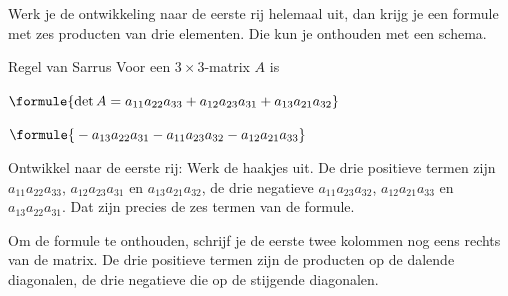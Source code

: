 
Werk je de ontwikkeling naar de eerste rij helemaal uit, dan krijg je een formule met zes producten van drie elementen. Die kun je onthouden met een schema.

\begin{theorie}
\begin{stelling}{Regel van Sarrus}
Voor een $3 \times 3$-matrix $A$ is

\vspace{1mm}
\qquad $\formule{\det A = a_{11}a_{22}a_{33} + a_{12}a_{23}a_{31} + a_{13}a_{21}a_{32}}$

\qquad\qquad\quad $\formule{{} - a_{13}a_{22}a_{31} - a_{11}a_{23}a_{32} - a_{12}a_{21}a_{33}}$
\end{stelling}

\begin{bewijs}
Ontwikkel naar de eerste rij:
Werk de haakjes uit. De drie positieve termen zijn $a_{11}a_{22}a_{33}$, $a_{12}a_{23}a_{31}$ en $a_{13}a_{21}a_{32}$, de drie negatieve $a_{11}a_{23}a_{32}$, $a_{12}a_{21}a_{33}$ en $a_{13}a_{22}a_{31}$. Dat zijn precies de zes termen van de formule.
\end{bewijs}
\end{theorie}

Om de formule te onthouden, schrijf je de eerste twee kolommen nog eens rechts van de matrix. De drie positieve termen zijn de producten op de dalende diagonalen, de drie negatieve die op de stijgende diagonalen.

